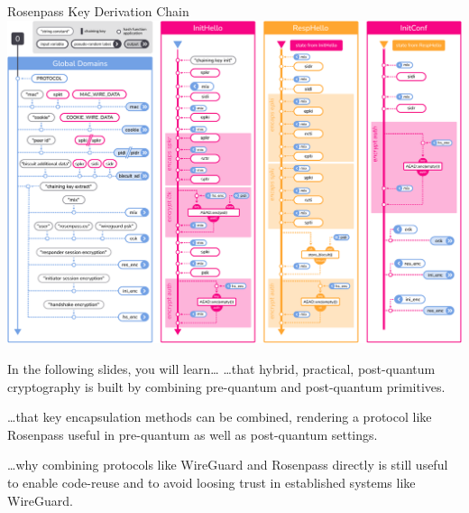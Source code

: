 \begin{frame}{Rosenpass Key Derivation Chain}
  \hypertarget{rosenpass-kdf-chain}{}
  \centering
  \includegraphics[height=.85\textheight]{graphics/rosenpass-wp-hashing-tree-rgb.pdf}
\end{frame}


\begin{frame}{In the following slides, you will learn…}
\hypertarget{you-will-learn-hybrid}{}
  …that hybrid, practical, post-quantum cryptography is built by combining pre-quantum and post-quantum primitives.

  \vspace{2em}
  …that key encapsulation methods can be combined, rendering a protocol like Rosenpass useful in pre-quantum as well
  as post-quantum settings.

  \vspace{2em}
  …why combining protocols like WireGuard and Rosenpass directly is still useful to enable code-reuse and to avoid
  loosing trust in established systems like WireGuard.
\end{frame}

